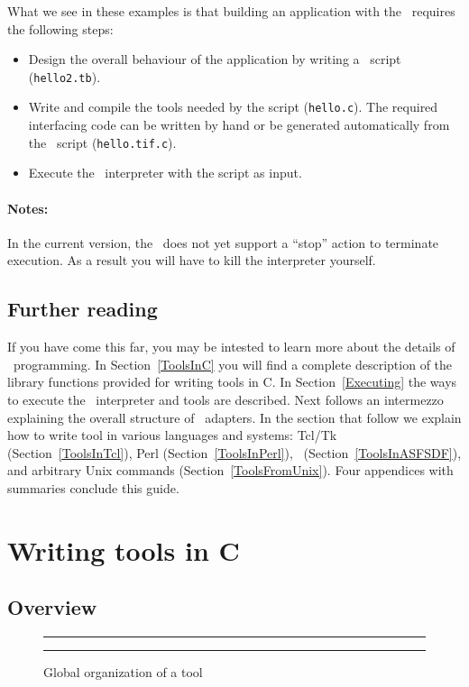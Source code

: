 What we see in these examples is that
building an application with the \TB\ requires the following steps:
\begin{itemize}
\item Design the overall behaviour of the application by writing a \T\ script ({\tt hello2.tb}).
\item Write and compile the tools needed by the script ({\tt hello.c}).
The required interfacing code can be written by hand or be generated
automatically from the \T\ script ({\tt hello.tif.c}).
\item Execute the \TB\ interpreter with the script as input.
\end{itemize}

\paragraph{Notes:}

In the current version, the \TB\ does not yet support a ``stop'' action
to terminate execution. As a result you will have to kill the interpreter yourself.

\subsection{Further reading}
If you have come this far, you may be intested to learn more about the details
of \TB\ programming.
In Section~\ref{ToolsInC} you will find a complete description
of the library functions provided for writing tools in C.
In Section~\ref{Executing} the ways to execute the \TB\ interpreter
and tools are described.
Next follows an intermezzo explaining the overall structure of \TB\ adapters.
In the section that follow we explain how to write tool in various languages
and systems: Tcl/Tk (Section~\ref{ToolsInTcl}),
Perl (Section~\ref{ToolsInPerl}),
\ASFSDF\ (Section~\ref{ToolsInASFSDF}), 
and arbitrary Unix commands (Section~\ref{ToolsFromUnix}).
Four appendices with summaries conclude this guide.

\section{\label{ToolsInC}Writing tools in C}

\subsection{Overview}

\begin{figure}[tb]
\rule{\textwidth}{0.5mm}
  
  \centerline{\box\graph}
  \caption{Global organization of a tool}
  \label{fig:Tool}
\rule{\textwidth}{0.5mm}
\end{figure}

